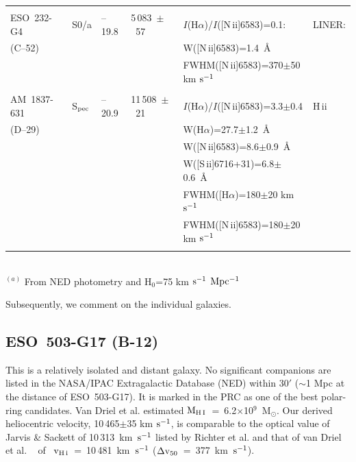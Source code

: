 \begin{table}
\begin{tabular}{llllll}
         &      &&                        &                &                \\
ESO~232-G4& S0/a & --19.8&5\,083~$\pm$~57 &
$I$(H$\alpha$)/$I$([N\,{\sc ii}]6583)=0.1: &  LINER:           \\
(C--52)   &  &&              & W([N\,{\sc ii}]6583)=1.4~\AA  &                \\
         &   &&           &  FWHM([N\,{\sc ii}]6583)=370$\pm$50 km $\rm s^{-1}$   &       \\
	 &   &&           &                                &      \\
AM~1837-631& S$_{\rm pec}$ & --20.9 &11\,508~$\pm$~21 &
$I$(H$\alpha$)/$I$([N\,{\sc ii}]6583)=3.3$\pm$0.4 & H\,{\sc ii}  \\
(D--29)  &      &&  & W(H$\alpha$)=27.7$\pm$1.2~\AA &  \\
         &      &&  & W([N\,{\sc ii}]6583)=8.6$\pm$0.9~\AA &  \\
	 &      &&  & W([S\,{\sc ii}]6716+31)=6.8$\pm$0.6~\AA &   \\	 
         &      &&  & FWHM([H$\alpha$)=180$\pm$20 km $\rm s^{-1}$ & \\
         &      &&  & FWHM([N\,{\sc ii}]6583)=180$\pm$20 km $\rm s^{-1}$ & \\
         &      &&                        &                &              \\	 	 
\hline
\end{tabular} \\

$^{(a)}$ From NED photometry and H$_0$=75 km $\rm s^{-1}$ $\rm Mpc^{-1}$
\end{table}

Subsequently, we comment on the individual galaxies.

\subsection{ESO~503-G17 (B-12)} 

This  is  a  relatively   isolated  and  distant   galaxy.  No  significant
companions are listed in the NASA/IPAC  Extragalactic Database (NED) within
30$'$  ($\sim$1 Mpc at the  distance of  ESO~503-G17).  It is marked in the
PRC  as  one  of  the  best   polar-ring   candidates.  Van  Driel  et  al.
    estimated    \hbox{$\rm    M_{\rm    H\,{\sc    I}}$    =
6.2$\times$10$^{9}$~M$_{\odot}$}.  Our   derived   heliocentric   velocity,
10\,465$\pm$35  km $\rm  s^{-1}$, is  comparable  to the  optical  value of
Jarvis \& Sackett of  \hbox{10\,313  km $\rm s^{-1}$}  listed by Richter et
al.    and  that  of van  Driel  et al.  ~  of
~\hbox{$\rm  v_{H\,{\sc i}}$ = 10\,481 km $\rm s^{-1}$}  (\hbox{$\Delta \rm
v_{50}$ = \hbox{377 km $\rm s^{-1}$}}).

